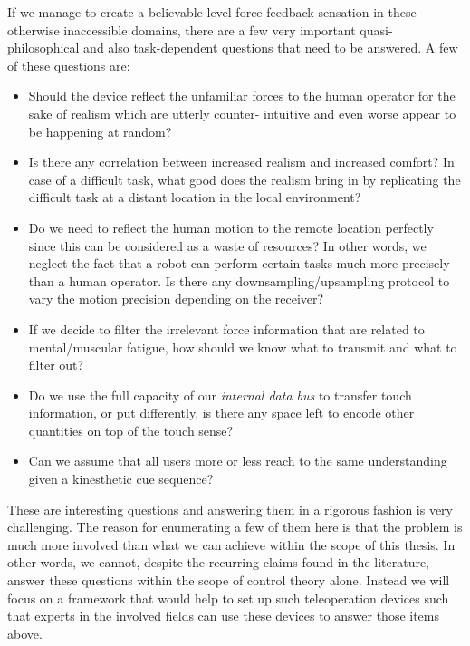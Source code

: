 If we manage to create a believable level force feedback sensation in these otherwise inaccessible domains, there are a few very 
important quasi-philosophical and also task-dependent questions that need to be answered. A few of these questions are:

\begin{itemize}
	\item Should the device reflect the unfamiliar forces to the human operator for the sake of realism which are utterly counter-
intuitive and even worse appear to be happening at random? 
    \item Is there any correlation between increased realism and increased comfort? In case of a difficult task, what good does the 
    realism bring in by replicating the difficult task at a distant location in the local environment?
    \item Do we need to reflect the human motion to the remote location perfectly since this can be considered as a waste of resources? 
    In other words, we neglect the fact that a robot can perform certain tasks much more precisely than a human operator. Is there any 
    downsampling/upsampling protocol to vary the motion precision depending on the receiver?
    \item If we decide to filter the irrelevant force information that are related to mental/muscular fatigue, how should we know what 
to transmit and what to filter out? 
    \item Do we use the full capacity of our \emph{internal data bus} to transfer touch information, or put differently, is there any 
space left to encode other quantities on top of the touch sense?
    \item Can we assume that all users more or less reach to the same understanding given a kinesthetic cue sequence?
\end{itemize}

These are interesting questions and answering them in a rigorous fashion is very challenging. The reason for enumerating a few of 
them here is that the problem is much more involved than what we can achieve within the scope of this thesis. In other words, we 
cannot, despite the recurring claims found in the literature, answer these questions within the scope of control theory alone. 
Instead we will focus on a framework that would help to set up such teleoperation devices such that experts in the involved fields 
can use these devices to answer those items above. 



